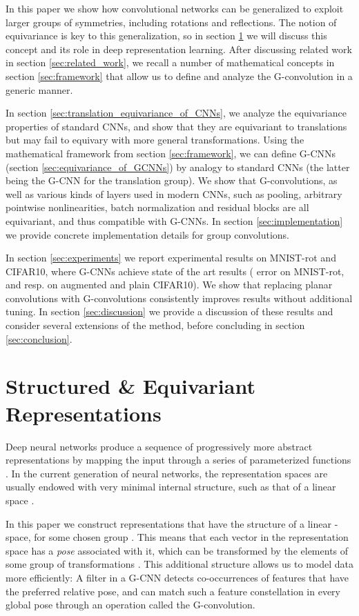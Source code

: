 \documentclass{article}
\begin{document}
In this paper we show how convolutional networks can be generalized to exploit larger groups of symmetries, including rotations and reflections.
The notion of equivariance is key to this generalization,
so in section \ref{sec:equivariance} we will discuss this concept and its role in deep representation learning.
After discussing related work in section \ref{sec:related_work}, we recall a number of mathematical concepts in section \ref{sec:framework} that allow us to define and analyze the G-convolution in a generic manner. 

In section \ref{sec:translation_equivariance_of_CNNs}, we analyze the equivariance properties of standard CNNs, and show that they are equivariant to translations but may fail to equivary with more general transformations.
Using the mathematical framework from section \ref{sec:framework}, we can define G-CNNs (section \ref{sec:equivariance_of_GCNNs}) by analogy to standard CNNs (the latter being the G-CNN for the translation group).
We show that G-convolutions, as well as various kinds of layers used in modern CNNs, such as pooling, arbitrary pointwise nonlinearities, batch normalization and residual blocks are all equivariant, and thus compatible with G-CNNs.
In section \ref{sec:implementation} we provide concrete implementation details for group convolutions.

In section \ref{sec:experiments} we report experimental results on MNIST-rot and CIFAR10, where G-CNNs achieve state of the art results ( error on MNIST-rot, and  resp.  on augmented and plain CIFAR10).
We show that replacing planar convolutions with G-convolutions consistently improves results without additional tuning.
In section \ref{sec:discussion} we provide a discussion of these results and consider several extensions of the method, before concluding in section \ref{sec:conclusion}.


\section{Structured \& Equivariant Representations}
\label{sec:equivariance}

Deep neural networks produce a sequence of progressively more abstract representations by mapping the input through a series of parameterized functions \cite{LeCun2015}.
In the current generation of neural networks, the representation spaces are usually endowed with very minimal internal structure, such as that of a linear space .

In this paper we construct representations that have the structure of a linear -space, for some chosen group .
This means that each vector in the representation space has a \emph{pose} associated with it, which can be transformed by the elements of some group of transformations .
This additional structure allows us to model data more efficiently:
A filter in a G-CNN detects co-occurrences of features that have the preferred relative pose,
and can match such a feature constellation in every global pose through an operation called the G-convolution.
\end{document}
